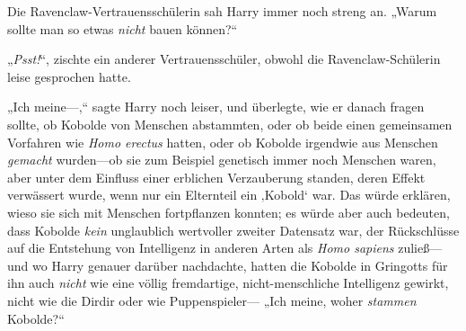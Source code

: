 Die Ravenclaw-Vertrauensschülerin sah Harry immer noch streng an. „Warum sollte man so etwas \emph{nicht} bauen können?“

„\emph{Psst!}“, zischte ein anderer Vertrauensschüler, obwohl die Ravenclaw-Schülerin leise gesprochen hatte.

„Ich meine—,“ sagte Harry noch leiser, und überlegte, wie er danach fragen sollte, ob Kobolde von Menschen abstammten, oder ob beide einen gemeinsamen Vorfahren wie \emph{Homo erectus} hatten, oder ob Kobolde irgendwie aus Menschen \emph{gemacht} wurden—ob sie zum Beispiel genetisch immer noch Menschen waren, aber unter dem Einfluss einer erblichen Verzauberung standen, deren Effekt verwässert wurde, wenn nur ein Elternteil ein ‚Kobold‘ war. Das würde erklären, wieso sie sich mit Menschen fortpflanzen konnten; es würde aber auch bedeuten, dass Kobolde \emph{kein} unglaublich wertvoller zweiter Datensatz war, der Rückschlüsse auf die Entstehung von Intelligenz in anderen Arten als \emph{Homo sapiens} zuließ—und wo Harry genauer darüber nachdachte, hatten die Kobolde in Gringotts für ihn auch \emph{nicht} wie eine völlig fremdartige, nicht-menschliche Intelligenz gewirkt, nicht wie die Dirdir oder wie Puppenspieler— „Ich meine, woher \emph{stammen} Kobolde?“





